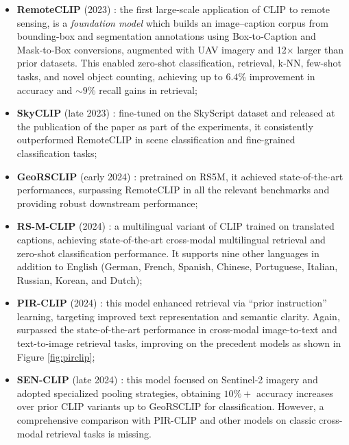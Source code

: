 \documentclass[a4paper, twoside, english]{sapthesis} %
\begin{document}
\begin{itemize}
    \item \textbf{RemoteCLIP} (2023) \cite{liu2024remoteclip}: the first large-scale application of CLIP to remote sensing, is a \emph{foundation model} which builds an image–caption corpus from bounding-box and segmentation annotations using Box‑to‑Caption and Mask‑to‑Box conversions, augmented with UAV imagery and 12× larger than prior datasets. This enabled zero-shot classification, retrieval, k‑NN, few-shot tasks, and novel object counting, achieving up to $6.4\%$ improvement in accuracy and $\sim 9\%$ recall gains in retrieval;
    \item \textbf{SkyCLIP} (late 2023) \cite{wang2024skyscript}: fine-tuned on the SkyScript dataset and released at the publication of the paper as part of the experiments, it consistently outperformed RemoteCLIP in scene classification and fine-grained classification tasks;
    \item \textbf{GeoRSCLIP} (early 2024) \cite{zhang2024rs5m}: pretrained on RS5M, it achieved state-of-the-art performances, surpassing RemoteCLIP in all the relevant benchmarks and providing robust downstream performance;
    \item \textbf{RS-M-CLIP} (2024) \cite{silva2024multilingual}: a multilingual variant of CLIP trained on translated captions, achieving state‑of‑the‑art cross-modal multilingual retrieval and zero-shot classification performance. It supports nine other languages in addition to English (German, French, Spanish, Chinese, Portuguese, Italian, Russian, Korean, and Dutch);
    \item \textbf{PIR-CLIP} (2024) \cite{pan2024pir}: this model enhanced retrieval via “prior instruction” learning, targeting improved text representation and semantic clarity. Again, surpassed the state-of-the-art performance in cross-modal image-to-text and text-to-image retrieval tasks, improving on the precedent models as shown in Figure \ref{fig:pirclip};
    \item \textbf{SEN-CLIP} (late 2024) \cite{jain2025senclip}: this model focused on Sentinel‑2 imagery and adopted specialized pooling strategies, obtaining $10\%+$ accuracy increases over prior CLIP variants up to GeoRSCLIP for classification. However, a comprehensive comparison with PIR-CLIP and other models on classic cross-modal retrieval tasks is missing.
\end{itemize}
\end{document}
